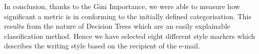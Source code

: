 In conclusion, thanks to the Gini Importance, we were able to measure how significant a metric is in conforming to the initially defined categorisation. This results from the nature of Decision Trees which are an easily explainable classification method. Hence we have selected eight different style markers which describes the writing style based on the recipient of the e-mail.